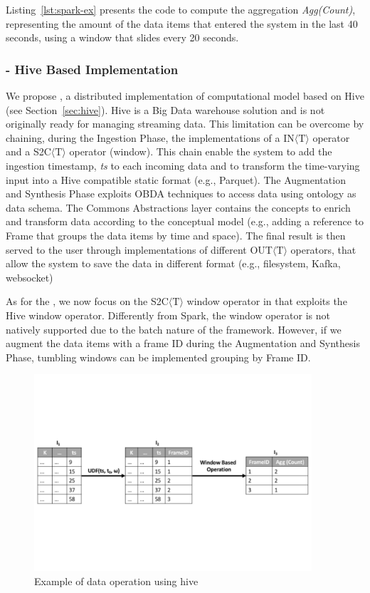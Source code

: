 {Listing~\ref{lst:spark-ex} presents the code to compute the aggregation \textit{Agg(Count)}, representing the amount of the data items that entered the system in the last 40 seconds, using a window that slides every 20 seconds.

\subsubsection{\protect\hivedi{} - Hive Based Implementation} \label{sec:comp-mod-impl-h-hive}
We propose \hivedi{}, a distributed implementation of \river{} computational model based on Hive (see Section~\ref{sec:hive}).
Hive is a Big Data warehouse solution and is not originally ready for managing streaming data.
This limitation can be overcome by chaining, during the Ingestion Phase, the implementations of a IN$\langle\mathrm{T}\rangle$ operator and a S2C$\langle\mathrm{T}\rangle$ operator (window). This chain enable the system to add the ingestion timestamp, \textit{ts} to each incoming data and to transform the time-varying input into a Hive compatible static format (e.g., Parquet). 
The Augmentation and Synthesis Phase exploits OBDA techniques to access data using \frappe{} ontology as data schema.
The \frappe{} Commons Abstractions layer contains the concepts to enrich and transform data according to the \frappe{} conceptual model (e.g., adding a reference to \frappe{} Frame that groups the data items by time and space).
The final result is then served to the user through implementations of different OUT$\langle\mathrm{T}\rangle$ operators, that allow the system to save the data in different format (e.g., filesystem, Kafka, websocket)  

As for the \sparkdi{}, we now focus on the S2C$\langle\mathrm{T}\rangle$ window operator in \hivedi{} that exploits the Hive window operator. Differently from Spark, the window operator is not natively supported due to the batch nature of the framework. However, if we augment the data items with a frame ID during the Augmentation and Synthesis Phase, tumbling windows can be implemented grouping by Frame ID. 

\begin{figure}[ht]
\centering
\includegraphics[width=0.92\textwidth]{img/hive_example}
\caption{Example of data operation using hive}
\label{fig:hive-ex}
\end{figure} 

}
